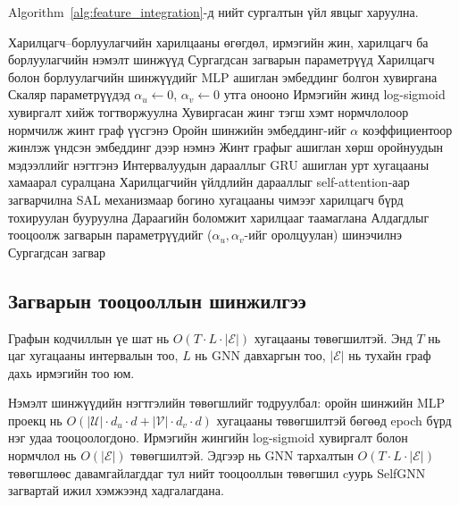 \documentclass[conference]{IEEEtran}
\begin{document}
Algorithm~\ref{alg:feature_integration}-д нийт сургалтын үйл явцыг харуулна.
 
\begin{algorithm}[t]
\caption{SelfGNN загварыг нэмэлт шинжүүдтэй сургах алгоритм}
\label{alg:feature_integration}
\begin{algorithmic}[1]
\REQUIRE 
Харилцагч–борлуулагчийн харилцааны өгөгдөл,
ирмэгийн жин, 
харилцагч ба борлуулагчийн нэмэлт шинжүүд
\ENSURE 
Сургагдсан загварын параметрүүд
\STATE Харилцагч болон борлуулагчийн шинжүүдийг MLP ашиглан эмбеддинг болгон хувиргана
\STATE Скаляр параметрүүдэд $\alpha_u \leftarrow 0$, $\alpha_v \leftarrow 0$ утга онооно
        \STATE Ирмэгийн жинд log-sigmoid хувиргалт хийж тогтворжуулна
        \STATE Хувиргасан жинг тэгш хэмт нормчлолоор нормчилж жинт граф үүсгэнэ
        \STATE Оройн шинжийн эмбеддинг-ийг $\alpha$ коэффициентоор жинлэж үндсэн эмбеддинг дээр нэмнэ
            \STATE Жинт графыг ашиглан хөрш оройнуудын мэдээллийг нэгтгэнэ
        \ENDFOR
    \ENDFOR
    \STATE Интервалуудын дарааллыг GRU ашиглан урт хугацааны хамаарал суралцана
    \STATE Харилцагчийн үйлдлийн дарааллыг self-attention-аар загварчилна
    \STATE SAL механизмаар богино хугацааны чимээг харилцагч бүрд тохируулан бууруулна
    \STATE Дараагийн боломжит харилцааг таамаглана
    \STATE Алдагдлыг тооцоолж загварын параметрүүдийг ($\alpha_u, \alpha_v$-ийг оролцуулан) шинэчилнэ
\ENDFOR
\RETURN Сургагдсан загвар
\end{algorithmic}
\end{algorithm}


\subsection{Загварын тооцооллын шинжилгээ}  
 
Графын кодчиллын үе шат нь $O(T \cdot L \cdot |\mathcal{E}|)$ хугацааны төвөгшилтэй. Энд $T$ нь цаг хугацааны интервалын тоо, $L$ нь GNN давхаргын тоо, $|\mathcal{E}|$ нь тухайн граф дахь ирмэгийн тоо юм.
 
Нэмэлт шинжүүдийн нэгтгэлийн төвөгшлийг тодруулбал: оройн шинжийн MLP проекц нь $O(|\mathcal{U}| \cdot d_u \cdot d + |\mathcal{V}| \cdot d_v \cdot d)$ хугацааны төвөгшилтэй бөгөөд epoch бүрд нэг удаа тооцоологдоно. Ирмэгийн жингийн log-sigmoid хувиргалт болон нормчлол нь $O(|\mathcal{E}|)$ төвөгшилтэй. Эдгээр нь GNN тархалтын $O(T \cdot L \cdot |\mathcal{E}|)$ төвөгшлөөс давамгайлагддаг тул нийт тооцооллын төвөгшил cуурь SelfGNN загвартай ижил хэмжээнд хадгалагдана.
\end{document}
